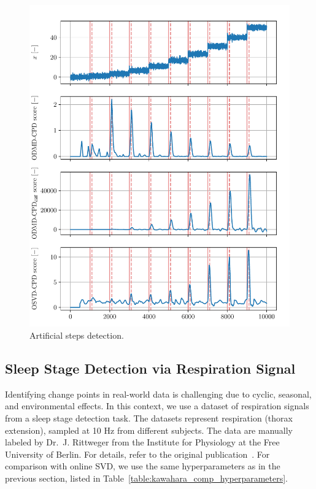 \begin{figure}
    \centering
    \includegraphics[width=\linewidth]{figures/y0-chd_r2_100_100-roll_301-dmd_w1.0-h80.pdf}
    \caption{Artificial steps detection.}\label{fig:artificial_steps_detection}
\end{figure}

\subsection{Sleep Stage Detection via Respiration Signal}
Identifying change points in real-world data is challenging due to cyclic, seasonal, and environmental effects. In this context, we use a dataset of respiration signals from a sleep stage detection task. The datasets represent respiration (thorax extension), sampled at 10 Hz from different subjects. The data are manually labeled by Dr.~J. Rittweger from the Institute for Physiology at the Free University of Berlin. For details, refer to the original publication~\citep{Keogh2005}. For comparison with online SVD, we use the same hyperparameters as in the previous section, listed in Table~\ref{table:kawahara_comp_hyperparameters}.

